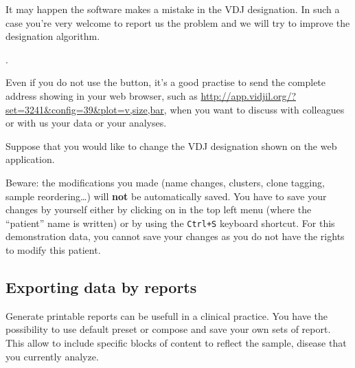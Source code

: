 \bigskip

It may happen the software makes a mistake in the VDJ designation.
In such a case you're very welcome to report us the problem
and we will try to improve the designation algorithm.

.

Even if you do not use the  button, it's a good practise
to send the complete address showing in your web browser, such
as  \url{http://app.vidjil.org/?set=3241&config=39&plot=v,size,bar},
when you want to discuss with colleagues or with us your data or your analyses.

\bigskip

Suppose that you would like to change the VDJ designation shown on the web application.

Beware: the modifications you made (name changes, clusters, clone
tagging, sample reordering\dots) will \textbf{not} be automatically saved. You have to save
your changes by yourself either by clicking on  in the top left menu (where the
``patient'' name is written) or by using the \texttt{Ctrl+S} keyboard
shortcut.
For this demonstration data, you cannot save your changes as you do not have
the rights to modify this patient.

\subsection{Exporting data by reports}

Generate printable reports can be usefull in a clinical practice.
You have the possibility to use default preset or compose and save your own sets of report.
This allow to include specific blocks of content to reflect the sample, disease that you currently analyze. %


